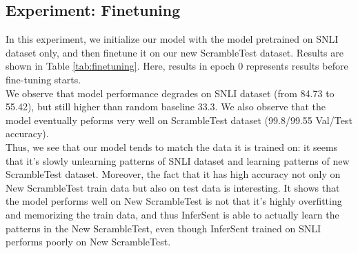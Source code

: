 \documentclass[10pt,letterpaper]{article}
\begin{document}
\subsection{Experiment: Finetuning}
In this experiment, we initialize our model with the model pretrained on SNLI dataset only, and then finetune it on our new ScrambleTest dataset. Results are shown in Table \ref{tab:finetuning}. Here, results in epoch 0 represents results before fine-tuning starts. \\
We observe that model performance degrades on SNLI dataset (from 84.73 to 55.42), but still higher than random baseline 33.3. We also observe that the model eventually peforms very well on ScrambleTest dataset (99.8/99.55 Val/Test accuracy). \\
Thus, we see that our model tends to match the data it is trained on: it seems that it's slowly unlearning patterns of SNLI dataset and learning patterns of new ScrambleTest dataset. Moreover, the fact that it has high accuracy not only on New ScrambleTest train data but also on test data is interesting. It shows that the model performs well on New ScrambleTest is not that it's highly overfitting and memorizing the train data, and thus InferSent is able to actually learn the patterns in the New ScrambleTest, even though InferSent trained on SNLI performs poorly on New ScrambleTest.

\begin{table}[htb]
 \caption{Experiment: Finetuning}
  \label{tab:finetuning}
\end{table}
\end{document}
